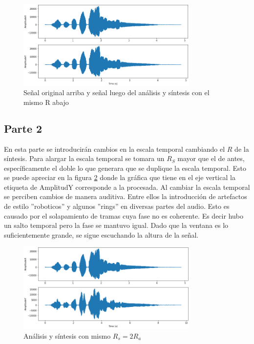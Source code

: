 \documentclass[a4paper]{article}
\begin{document}
\begin{figure}[h!]
\centering
\includegraphics[width=0.8\textwidth]{resuas.png}
\caption{Señal original arriba y señal luego del análisis y síntesis con el mismo R abajo}
\label{resuas}
\end{figure}

\subsection{Parte 2}
En esta parte se introducirán cambios en la escala temporal cambiando el $R$ de la síntesis. Para alargar la escala temporal se tomara un $R_S$ mayor que el de antes, específicamente el doble lo que generara que se duplique la escala temporal. Esto se puede apreciar en la figura \ref{doble} donde la gráfica que tiene en el eje vertical la etiqueta de AmplitudY corresponde a la procesada. Al cambiar la escala temporal se perciben cambios de manera auditiva. Entre ellos la introducción de artefactos de estilo ''roboticos'' y algunos ''rings'' en diversas partes del audio. Esto es causado por el solapamiento de tramas cuya fase no es coherente. Es decir hubo un salto temporal pero la fase se mantuvo igual. Dado que la ventana es lo suficientemente grande, se sigue escuchando la altura de la señal.

\begin{figure}[h!]
\centering
\includegraphics[width=0.8\textwidth]{doble.png}
\caption{Análisis y síntesis con mismo $R_s = 2R_a$}
\label{doble}
\end{figure}
\end{document}
